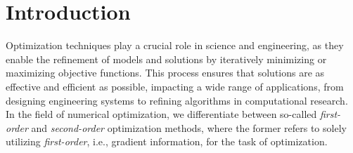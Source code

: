 \begingroup


\chapter*{Introduction}\label{ch:introduction}

Optimization techniques play a crucial role in science and engineering,
as they enable the refinement of models and solutions by iteratively minimizing or maximizing
objective functions. This process ensures that solutions are as effective and efficient as possible,
impacting a wide range of applications,
from designing engineering systems to refining algorithms in computational research.\\
In the field of numerical optimization, we differentiate between so-called \emph{first-order} and \emph{second-order} optimization methods,
where the former refers to solely utilizing \emph{first-order}, i.e., gradient information, for the task of optimization.

